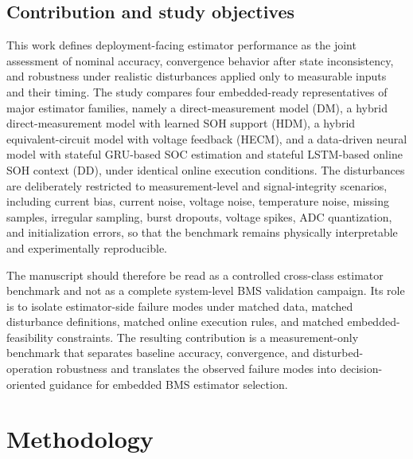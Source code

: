 \documentclass[review,nopreprintline]{elsarticle}
\begin{document}
\subsection{Contribution and study objectives}
This work defines deployment-facing estimator performance as the joint assessment of nominal accuracy, convergence behavior after state inconsistency, and robustness under realistic disturbances applied only to measurable inputs and their timing. The study compares four embedded-ready representatives of major estimator families, namely a direct-measurement model (DM), a hybrid direct-measurement model with learned SOH support (HDM), a hybrid equivalent-circuit model with voltage feedback (HECM), and a data-driven neural model with stateful GRU-based SOC estimation and stateful LSTM-based online SOH context (DD), under identical online execution conditions. The disturbances are deliberately restricted to measurement-level and signal-integrity scenarios, including current bias, current noise, voltage noise, temperature noise, missing samples, irregular sampling, burst dropouts, voltage spikes, ADC quantization, and initialization errors, so that the benchmark remains physically interpretable and experimentally reproducible.

The manuscript should therefore be read as a controlled cross-class estimator benchmark and not as a complete system-level BMS validation campaign. Its role is to isolate estimator-side failure modes under matched data, matched disturbance definitions, matched online execution rules, and matched embedded-feasibility constraints. The resulting contribution is a measurement-only benchmark that separates baseline accuracy, convergence, and disturbed-operation robustness and translates the observed failure modes into decision-oriented guidance for embedded BMS estimator selection.

\section{Methodology}
\end{document}
